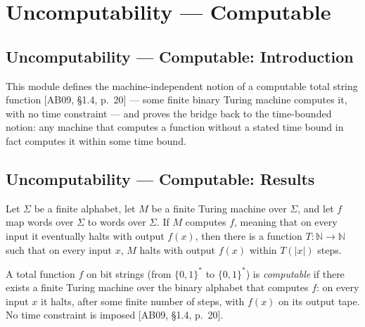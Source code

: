 \section{Uncomputability --- Computable}
\subsection*{Uncomputability --- Computable: Introduction}

This module defines the machine-independent notion of a computable total string
function [AB09, \S 1.4, p.\ 20] --- some finite binary Turing machine computes it,
with no time constraint --- and proves the bridge back to the time-bounded notion:
any machine that computes a function without a stated time bound in fact computes
it within some time bound.

\subsection*{Uncomputability --- Computable: Results}

\begin{theorem}
\label{Turing.FinTM.Computes.exists_computesFunInTime}
\leanok
{}
Let $\Sigma$ be a finite alphabet, let $M$ be a finite Turing machine over $\Sigma$, and
let $f$ map words over $\Sigma$ to words over $\Sigma$. If $M$ computes $f$, meaning
that on every input it eventually halts with output $f(x)$, then there is a function
$T:\mathbb{N}\to\mathbb{N}$ such that on every input $x$, $M$ halts with output $f(x)$
within $T(|x|)$ steps.
\end{theorem}

\begin{definition}
\label{Complexity.Computable}
\leanok
{}
A total function $f$ on bit strings (from $\{0,1\}^*$ to $\{0,1\}^*$) is
\emph{computable} if there exists a finite Turing machine over the binary
alphabet that computes $f$: on every input $x$ it halts, after some finite
number of steps, with $f(x)$ on its output tape. No time constraint is imposed
[AB09, \S 1.4, p.\ 20].
\end{definition}
